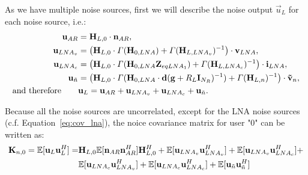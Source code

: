 As we have multiple noise sources, first we will describe the noise output $\vec{u}_L$ for each noise source, i.e.:
\begin{align}
\label{eq:noise_output}
\nonumber
\mathbf{u}_{AR} &= \mathbf{H}_{L,0}\cdot\mathbf{n}_{AR},\\\nonumber 
\mathbf{u}_{LNA_v} &= \left(\mathbf{H}_{L,0}\cdot\Gamma(\mathbf{H}_{0,LNA})+\Gamma(\mathbf{H}_{L,LNA_v})^{-1}\right)\cdot\mathbf{v}_{LNA},\\\nonumber
\mathbf{u}_{LNA_c} &= \left(\mathbf{H}_{L,0}\cdot\Gamma(\mathbf{H}_{0,LNA}\mathbf{Z}_{eqLNA_1})+\Gamma(\mathbf{H}_{L,LNA_c})^{-1}\right)\cdot\mathbf{i}_{LNA},\\\nonumber
\mathbf{u}_{\tilde{n}} &= \left(\mathbf{H}_{L,0}\cdot\Gamma(\mathbf{H}_{0,LNA}\cdot\mathbf{d}(\mathbf{g}+R_L\mathbf{I}_{N_R})^{-1})+\Gamma(\mathbf{H}_{L,n})^{-1}\right)\cdot\mathbf{\tilde{v}}_{n},\\
\text{and therefore}\qquad &\mathbf{u}_L = \mathbf{u}_{AR} + \mathbf{u}_{LNA_v} + \mathbf{u}_{LNA_c} + \mathbf{u}_{\tilde{n}}.
\end{align}

Because all the noise sources are uncorrelated, except for the LNA noise sources (c.f. Equation~\eqref{eq:cov_lna}), the noice covariance matrix for user "0" can be written as:
\begin{align}
\label{eq:exp_noise}\nonumber
\mat{K}_{n,0} =\mathbb{E}[\vec{u}_L\vec{u}_L^H] = &\mat{H}_{L,0}\mathbb{E}[\vec{n}_{AR}\vec{n}_{AR}^H]\mat{H}_{L,0}^H + 
\mathbb{E}[\vec{u}_{LNA_v}\vec{u}_{LNA_v}^H] +
\mathbb{E}[\vec{u}_{LNA_v}\vec{u}_{LNA_c}^H] +\\%
\quad&\mathbb{E}[\vec{u}_{LNA_c}\vec{u}_{LNA_v}^H] +
\mathbb{E}[\vec{u}_{LNA_c}\vec{u}_{LNA_c}^H] +
\mathbb{E}[\vec{u}_{\tilde{n}}\vec{u}_{\tilde{n}}^H]
\end{align}

